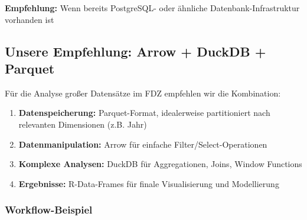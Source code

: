 \documentclass[
  ngerman,
  10pt,
  twocolumn]{article}
\providecommand{\tightlist}{%
  \setlength{\itemsep}{0pt}\setlength{\parskip}{0pt}}
\begin{document}
\textbf{Empfehlung:} Wenn bereits PostgreSQL- oder ähnliche
Datenbank-Infrastruktur vorhanden ist

\subsection{Unsere Empfehlung: Arrow + DuckDB +
Parquet}\label{unsere-empfehlung-arrow-duckdb-parquet}

Für die Analyse großer Datensätze im FDZ empfehlen wir die Kombination:

\begin{enumerate}
\def\labelenumi{\arabic{enumi}.}
\tightlist
\item
  \textbf{Datenspeicherung:} Parquet-Format, idealerweise partitioniert
  nach relevanten Dimensionen (z.B. Jahr)
\item
  \textbf{Datenmanipulation:} Arrow für einfache
  Filter/Select-Operationen
\item
  \textbf{Komplexe Analysen:} DuckDB für Aggregationen, Joins, Window
  Functions
\item
  \textbf{Ergebnisse:} R-Data-Frames für finale Visualisierung und
  Modellierung
\end{enumerate}

\subsubsection{Workflow-Beispiel}\label{workflow-beispiel}
\end{document}
